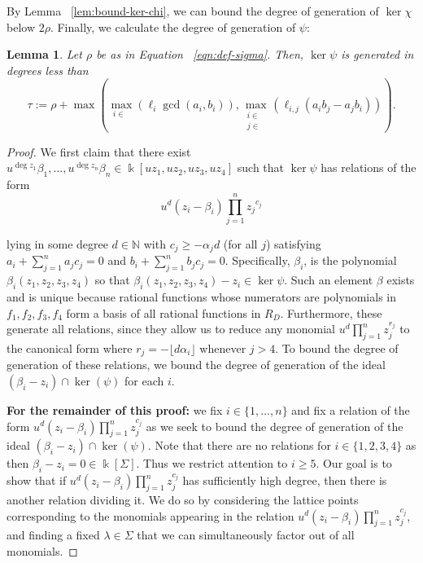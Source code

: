 \documentclass{amsart}
\theoremstyle{plain}
\newtheorem{lem}[thm]{Lemma}
\theoremstyle{definition}
\theoremstyle{remark}
\numberwithin{equation}{section}
\newcommand\bk{{\Bbbk}}
\newcommand\bida{a}
\newcommand\bidb{b}
\DeclareMathOperator{\Te}{T_=}
\DeclareMathOperator{\Tp}{T_+}
\DeclareMathOperator{\Tm}{T_-}
\begin{document}
By Lemma ~\ref{lem:bound-ker-chi}, we can bound the degree of generation of $\ker \chi$ below
$2 \rho$.
Finally, we calculate the degree of generation of $\psi$:

\begin{lem}
\label{lem:hirz-bound-ker-psi}
Let $\rho$ be as in Equation ~\eqref{eqn:def-sigma}. Then, $\ker \psi$ is generated in degrees less than
\[
	\tau := \rho
	+ \max \left(\max_{i\in \Te}(\ell_i \gcd(a_i, b_i)), \max_{\substack{
	i \in	\Tp \\ j\in \Tm}} (\ell_{i,j} (\bida_i \bidb_j - \bida_j \bidb_i))
	\right).
\]
\end{lem}

\begin{proof}
We first claim that there exist $u^{\deg z_1}\beta_1, \ldots, u^{\deg z_n} \beta_n\in \bk[uz_1, uz_2, uz_3, uz_4]$
such that $\ker \psi$ has relations of the form
\[
	u^d(z_i - \beta_i)\prod_{j=1}^n {z_j}^{c_{j}}
\]

\noindent
lying in some degree $d \in \mathbb{N}$
with $c_j \ge -\alpha_j d$ (for all $j$) satisfying $\bida_i + \sum_{j = 1}
^n \bida_j c_j = 0$ and $\bidb_i + \sum_{j=1}^n \bidb_j c_j = 0$.
Specifically, $\beta_i$,
is the polynomial $\beta_i(z_1,z_2,z_3,z_4)$ so that
$\beta_i(z_1,z_2,z_3,z_4) - z_i \in \ker \psi$. Such an element
$\beta$ exists and is unique because rational functions
whose numerators are polynomials in $f_1, f_2, f_3, f_4$ form a basis
of all rational functions in $R_D$. Furthermore, these
generate all relations, since they allow us to reduce any monomial $u^d\prod_{j =
1}^n z_j^{r_j}$ to the canonical form where $r_j = -\lfloor d \alpha_i
\rfloor$ whenever $j > 4$. To bound the degree of generation of these relations,
we bound the degree of generation of the ideal $(\beta_i - z_i) \cap
\ker(\psi)$ for each $i$.

\textbf{For the remainder of this proof:} we fix $i \in \{1, \ldots,
n\}$ and fix a relation of the form $u^d (z_i - \beta_i) \prod_{j =
1}^n z_j^{c_j}$ as we seek to bound the degree of generation of the
ideal $(\beta_i - z_i) \cap \ker(\psi)$. Note that there are no
relations for $i\in \{1, 2, 3, 4\}$ as then $\beta_i - z_i = 0 \in
\bk[\Sigma]$. Thus we restrict attention to $i \ge 5$. Our goal is
to show that if $u^d(z_i - \beta_i)\prod_{j=1}^n z_j^{c_j}$ has
sufficiently high degree, then there is another relation dividing
it. We do so by considering the lattice points corresponding to the
monomials appearing in the relation $u^d(z_i - \beta_i)\prod_{j=1}^
n z_j^{c_j}$, and finding a fixed $\lambda\in \Sigma$ that we can
simultaneously factor out of all monomials.



\end{proof}
\end{document}
